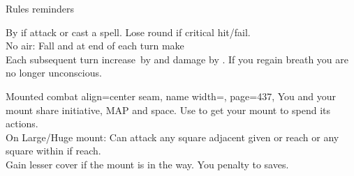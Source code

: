 \begin{PageFront}
\begin{Tables}{\frontTableHeight}
\begin{Table}{Rules reminders}
\begin{entry}{}
{                By  if attack or cast a spell.
                Lose  round if critical hit/fail.}\\
                No air: Fall  and at end of each turn make \Fortitude[][val=20]  \hfill
                \\
                Each subsequent turn increase \DC\,by  and damage by . \hfill
                If you regain breath you are no longer unconscious.%
            \end{entry}
            \begin{entry}{Mounted combat}{%
                align=center seam,
                name width=\conditionLength,
                page=437,
            }
                You and your mount share initiative, MAP and space.
                Use  to get your mount to spend its actions.\\
                On Large/Huge mount: Can attack any square adjacent given  or  \Feet reach or any square within  \Feet if  \Feet reach.\\
                Gain lesser cover if the mount is in the way. You  \Cirm penalty to \ReflexT saves.\hfill
            \end{entry}

        \end{Table}
    \end{Tables}%
\end{PageFront}